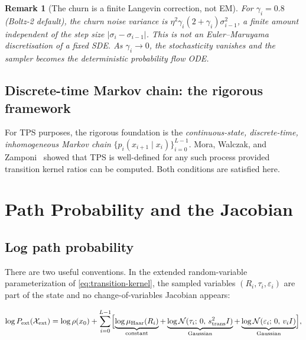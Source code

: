 \documentclass[11pt,a4paper]{article}
\newtheorem{remark}[theorem]{Remark}
\newcommand{\N}{\mathcal{N}}
\newcommand{\Haar}{\mu_{\mathrm{Haar}}}
\begin{document}
\begin{remark}[The churn is a finite Langevin correction, not EM]
  For $\gamma_i = 0.8$ (Boltz-2 default), the churn noise variance is
  $\eta^2\gamma_i(2+\gamma_i)\sigma_{i-1}^2$, a \emph{finite} amount
  independent of the step size $|\sigma_i - \sigma_{i-1}|$.  This is
  \emph{not} an Euler--Maruyama discretisation of a fixed SDE.  As
  $\gamma_i \to 0$, the stochasticity vanishes and the sampler becomes
  the deterministic probability flow ODE.
\end{remark}

\subsection{Discrete-time Markov chain: the rigorous framework}

For TPS purposes, the rigorous foundation is the
\emph{continuous-state, discrete-time, inhomogeneous Markov chain}
$\{p_i(x_{i+1} \mid x_i)\}_{i=0}^{L-1}$.
Mora, Walczak, and Zamponi~\cite{mora2012tps} showed that TPS is
well-defined for any such process provided transition kernel ratios
can be computed.  Both conditions are satisfied here.

\section{Path Probability and the Jacobian}
\label{sec:path-prob}

\subsection{Log path probability}

There are two useful conventions.  In the extended random-variable
parameterization of \cref{eq:transition-kernel}, the sampled variables
$(R_i,\tau_i,\varepsilon_i)$ are part of the state and no
change-of-variables Jacobian appears:

\begin{equation}
  \log P_{\rm ext}(\mathcal{X}_{\rm ext})
  = \log\rho(x_0)
  + \sum_{i=0}^{L-1}
    \Bigl[
      \underbrace{\log\Haar(R_i)}_{\text{constant}}
      + \underbrace{\log\N(\tau_i;\, 0,\, s_{\mathrm{trans}}^2 I)}_{\text{Gaussian}}
      + \underbrace{\log\N(\varepsilon_i;\, 0,\, v_i I)}_{\text{Gaussian}}
    \Bigr],
  \label{eq:log-path-prob}
\end{equation}
\end{document}
